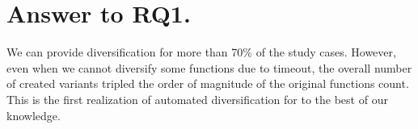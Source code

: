 \section{Answer to RQ1.}


We can provide diversification for more than 70\% of the study cases. However, even when we cannot diversify some functions due to timeout, the overall number of created variants tripled the order of magnitude of the original functions count. This is the first realization of automated diversification for \wasm to the best of our knowledge.

\begin{comment}

While our work is very limited by the provided corpora, it can be easily extended to other\dots

An application that benefits from the ablity of CROW is the large amount of generated variants. 


- CHeckLong questions for 80%
- Stress how to do experiments in Software Engineering, the theory behind how to do this in CS.
- The objects of the experiments are programs that ... 
- Motivate the corpora selection, size, can be ported, security sensitive, etc,
- Do not mention CROW in the selection criteria.
- The motivation is not related to tools, only to concepts
- Move paragraph after listing of coprpora to before.
- 


\end{comment}